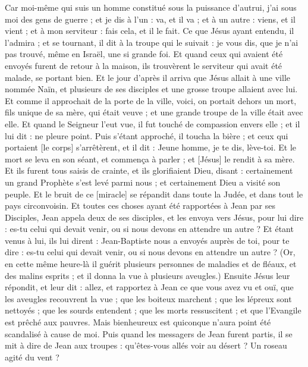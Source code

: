 \begin{multicols}{2}
Car moi-même qui suis un homme constitué sous la puissance d'autrui, j'ai sous moi des gens de guerre ; et je dis à l'un : va, et il va ; et à un autre : viens, et il vient ; et à mon serviteur : fais cela, et il le fait.
Ce que Jésus ayant entendu, il l'admira ; et se tournant, il dit à la troupe qui le suivait : je vous dis, que je n'ai pas trouvé, même en Israël, une si grande foi.
Et quand ceux qui avaient été envoyés furent de retour à la maison, ils trouvèrent le serviteur qui avait été malade, se portant bien.
Et le jour d'après il arriva que Jésus allait à une ville nommée Naïn, et plusieurs de ses disciples et une grosse troupe allaient avec lui.
Et comme il approchait de la porte de la ville, voici, on portait dehors un mort, fils unique de sa mère, qui était veuve ; et une grande troupe de la ville était avec elle.
Et quand le Seigneur l'eut vue, il fut touché de compassion envers elle ; et il lui dit : ne pleure point.
Puis s'étant approché, il toucha la bière ; et ceux qui portaient [le corps] s'arrêtèrent, et il dit : Jeune homme, je te dis, lève-toi.
Et le mort se leva en son séant, et commença à parler ; et [Jésus] le rendit à sa mère.
Et ils furent tous saisis de crainte, et ils glorifiaient Dieu, disant : certainement un grand Prophète s'est levé parmi nous ; et certainement Dieu a visité son peuple.
Et le bruit de ce [miracle] se répandit dans toute la Judée, et dans tout le pays circonvoisin.
Et toutes ces choses ayant été rapportées à Jean par ses Disciples,
Jean appela deux de ses disciples, et les envoya vers Jésus, pour lui dire : es-tu celui qui devait venir, ou si nous devons en attendre un autre ?
Et étant venus à lui, ils lui dirent : Jean-Baptiste nous a envoyés auprès de toi, pour te dire : es-tu celui qui devait venir, ou si nous devons en attendre un autre ?
(Or, en cette même heure-là il guérit plusieurs personnes de maladies et de fléaux, et des malins esprits ; et il donna la vue à plusieurs aveugles.)
Ensuite Jésus leur répondit, et leur dit : allez, et rapportez à Jean ce que vous avez vu et ouï, que les aveugles recouvrent la vue ; que les boiteux marchent ; que les lépreux sont nettoyés ; que les sourds entendent ; que les morts ressuscitent ; et que l'Evangile est prêché aux pauvres.
Mais bienheureux est quiconque n'aura point été scandalisé à cause de moi.
Puis quand les messagers de Jean furent partis, il se mit à dire de Jean aux troupes : qu'êtes-vous allés voir au désert ? Un roseau agité du vent ?

\end{multicols}
